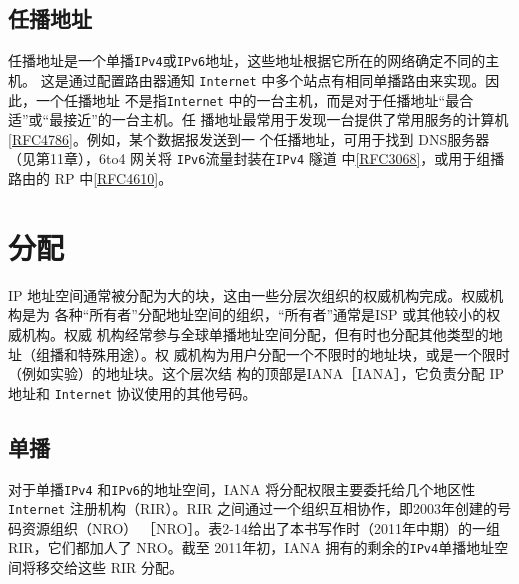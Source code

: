 \subsection{任播地址}
任播地址是一个单播\verb|IPv4|或\verb|IPv6|地址，这些地址根据它所在的网络确定不同的主机。
这是通过配置路由器通知 \verb|Internet| 中多个站点有相同单播路由来实现。因此，一个任播地址
不是指\verb|Internet| 中的一台主机，而是对于任播地址“最合适”或“最接近”的一台主机。任
播地址最常用于发现一台提供了常用服务的计算机\href{https://www.rfc-editor.org/rfc/rfc4786}{[RFC4786]}。例如，某个数据报发送到一
个任播地址，可用于找到 DNS服务器（见第11章），6to4 网关将 \verb|IPv6|流量封装在\verb|IPv4| 隧道
中\href{https://www.rfc-editor.org/rfc/rfc3068}{[RFC3068]}，或用于组播路由的 RP 中\href{https://www.rfc-editor.org/rfc/rfc4610}{[RFC4610]}。

\section{分配}
IP 地址空间通常被分配为大的块，这由一些分层次组织的权威机构完成。权威机构是为
各种“所有者”分配地址空间的组织，“所有者”通常是ISP 或其他较小的权威机构。权威
机构经常参与全球单播地址空间分配，但有时也分配其他类型的地址（组播和特殊用途）。权
威机构为用户分配一个不限时的地址块，或是一个限时（例如实验）的地址块。这个层次结
构的顶部是IANA［IANA］，它负责分配 IP 地址和 \verb|Internet| 协议使用的其他号码。

\subsection{单播}
对于单播\verb|IPv4| 和\verb|IPv6|的地址空间，IANA 将分配权限主要委托给几个地区性 \verb|Internet|
注册机构（RIR）。RIR 之间通过一个组织互相协作，即2003年创建的号码资源组织（NRO）
［NRO］。表2-14给出了本书写作时（2011年中期）的一组RIR，它们都加人了 NRO。截至
2011年初，IANA 拥有的剩余的\verb|IPv4|单播地址空间将移交给这些 RIR 分配。

